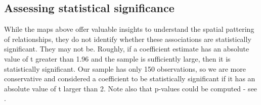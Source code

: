 \documentclass[
]{book}
\begin{document}
\hypertarget{assessing-statistical-significance}{%
\subsection{Assessing statistical significance}\label{assessing-statistical-significance}}

While the maps above offer valuable insights to understand the spatial pattering of relationships, they do not identify whether these associations are statistically significant. They may not be. Roughly, if a coefficient estimate has an absolute value of t greater than 1.96 and the sample is sufficiently large, then it is statistically significant. Our sample has only 150 observations, so we are more conservative and considered a coefficient to be statistically significant if it has an absolute value of t larger than 2. Note also that p-values could be computed - see \citet{lu2014gwmodel}.
\end{document}
